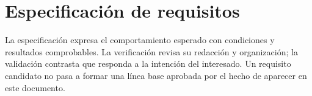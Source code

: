 
\section{Especificación de requisitos}
\label{sec:especificacion}

La especificación expresa el comportamiento esperado con condiciones y
resultados comprobables. La verificación revisa su redacción y
organización; la validación contrasta que responda a la intención del
interesado. Un requisito candidato no pasa a formar una línea base
aprobada por el hecho de aparecer en este documento.


